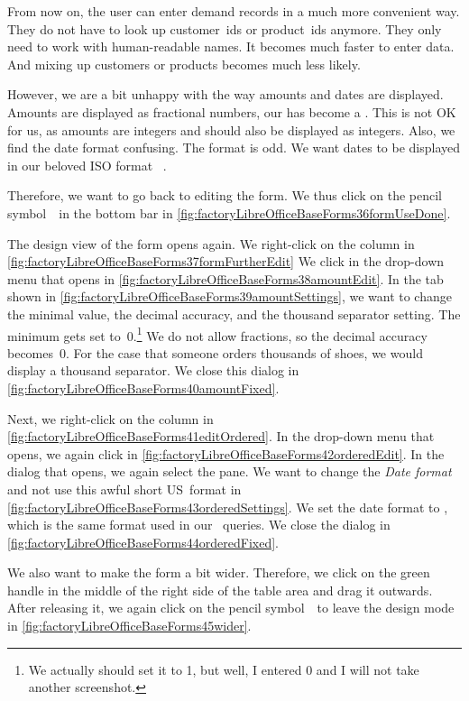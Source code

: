 From now on, the user can enter demand records in a much more convenient way.
They do not have to look up customer~ids or product~ids anymore.
They only need to work with human-readable names.
It becomes much faster to enter data.
And mixing up customers or products becomes much less likely.

However, we are a bit unhappy with the way amounts and dates are displayed.
Amounts are displayed as fractional numbers, our  has become a .
This is not OK for us, as amounts are integers and should also be displayed as integers.
Also, we find the date format confusing.
The  format is odd.
We want dates to be displayed in our beloved ISO format ~\cite{ISO860112019}.

Therefore, we want to go back to editing the form.
We thus click on the pencil symbol~\libreOfficeBaseDesignMode\ in the bottom bar in \cref{fig:factoryLibreOfficeBaseForms36formUseDone}.

The design view of the form opens again.
We right-click on the  column in \cref{fig:factoryLibreOfficeBaseForms37formFurtherEdit}
We click  in the drop-down menu that opens in \cref{fig:factoryLibreOfficeBaseForms38amountEdit}.
In the  tab shown in \cref{fig:factoryLibreOfficeBaseForms39amountSettings}, we want to change the minimal value, the decimal accuracy, and the thousand separator setting.
The minimum gets set to~0.\footnote{%
We actually should set it to 1, but well, I entered 0 and I will not take another screenshot.}
We do not allow fractions, so the decimal accuracy becomes~0.
For the case that someone orders thousands of shoes, we would display a thousand separator.
We close this dialog in \cref{fig:factoryLibreOfficeBaseForms40amountFixed}.

Next, we right-click on the  column in \cref{fig:factoryLibreOfficeBaseForms41editOrdered}.
In the drop-down menu that opens, we again click  in \cref{fig:factoryLibreOfficeBaseForms42orderedEdit}.
In the dialog that opens, we again select the  pane.
We want to change the \emph{Date format} and not use this awful short US~format in \cref{fig:factoryLibreOfficeBaseForms43orderedSettings}.
We set the date format to , which is the same format used in our \sql\ queries.
We close the dialog in \cref{fig:factoryLibreOfficeBaseForms44orderedFixed}.

We also want to make the form a bit wider.
Therefore, we click on the green handle in the middle of the right side of the table area and drag it outwards.
After releasing it, we again click on the pencil symbol~\libreOfficeBaseDesignMode\ to leave the design mode in \cref{fig:factoryLibreOfficeBaseForms45wider}.

